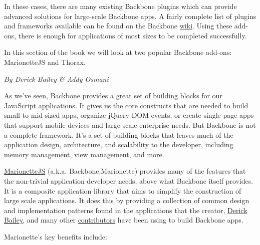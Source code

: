 \documentclass[9pt]{book}
\begin{document}
In these cases, there are many existing Backbone plugins which can
provide advanced solutions for large-scale Backbone apps. A fairly
complete list of plugins and frameworks available can be found on the
Backbone
\href{https://github.com/documentcloud/backbone/wiki/Extensions\%2C-Plugins\%2C-Resources}{wiki}.
Using these add-ons, there is enough for applications of most sizes to
be completed successfully.

In this section of the book we will look at two popular Backbone
add-ons: MarionetteJS and Thorax.


\emph{By Derick Bailey \& Addy Osmani}

As we've seen, Backbone provides a great set of building blocks for our
JavaScript applications. It gives us the core constructs that are needed
to build small to mid-sized apps, organize jQuery DOM events, or create
single page apps that support mobile devices and large scale enterprise
needs. But Backbone is not a complete framework. It's a set of building
blocks that leaves much of the application design, architecture, and
scalability to the developer, including memory management, view
management, and more.

\href{http://marionettejs.com}{MarionetteJS} (a.k.a.
Backbone.Marionette) provides many of the features that the non-trivial
application developer needs, above what Backbone itself provides. It is
a composite application library that aims to simplify the construction
of large scale applications. It does this by providing a collection of
common design and implementation patterns found in the applications that
the creator, \href{http://lostechies.com/derickbailey/}{Derick Bailey},
and many other
\href{https://github.com/marionettejs/backbone.marionette/graphs/contributors}{contributors}
have been using to build Backbone apps.

Marionette's key benefits include:
\end{document}
